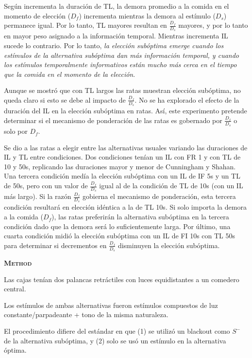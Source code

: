 \documentclass[a4paper,12pt]{article}
\begin{document}
\begin{enumerate}
		Según incrementa la duración de TL, la demora promedio a la comida en el momento de elección ($D_{f}$) incrementa mientras la demora al estímulo ($D_{s}$) permanece igual. Por lo tanto, TL mayores resultan en $\frac{D_{f}}{D_{s}}$ mayores, y por lo tanto en mayor peso asignado a la información temporal. Mientras incrementa IL sucede lo contrario. Por lo tanto, {\itshape la elección subóptima emerge cuando los estímulos de la alternativa subóptima dan más información temporal, y cuando los estímulos temporalmente informativos están mucho más cerca en el tiempo que la comida en el momento de la elección}.
\end{enumerate}

Aunque se mostró que con TL largos las ratas muestran elección subóptima, no queda claro si esto se debe al impacto de $\frac{D_{f}}{D_{s}}$. No se ha explorado el efecto de la duración del IL en la elección subóptima en ratas. Así, este experimento pretende determinar si el mecanismo de ponderación de las ratas es gobernado por $\frac{D_{f}}{D_{s}}$ o solo por $D_{f}$.

Se dio a las ratas a elegir entre las alternativas usuales variando las duraciones de IL y TL entre condiciones. Dos condiciones tenían un IL con FR 1 y con TL de 10 y 50s, replicando las duraciones mayor y menor de Cunningham y Shahan. Una tercera condición medía la elección subóptima con un IL de IF 5s y un TL de 50s, pero con un valor de $\frac{D_{f}}{D_{s}}$ igual al de la condición de TL de 10s (con un IL más largo). Si la razón $\frac{D_{f}}{D_{s}}$ gobierna el mecanismo de ponderación, esta tercera condición resultará en elección idéntica a la de TL 10s. Si solo importa la demora a la comida ($D_{f}$), las ratas preferirán la alternativa subóptima en la tercera condición dado que la demora será lo suficientemente larga. Por último, una cuarta condición midió la elección subóptima con un IL de FI 10s con TL 50s para determinar si decrementos en $\frac{D_{f}}{D_{s}}$ disminuyen la elección subóptima.

{\scshape\bfseries Method}

Las cajas tenían dos palancas retráctiles con luces equidistantes a un comedero central.

Los estímulos de ambas alternativas fueron estímulos compuestos de luz constante/parpadeante + tono de la misma naturaleza.

El procedimiento difiere del estándar en que (1) se utilizó un blackout como $S^{-}$ de la alternativa subóptima, y (2) solo se usó un estímulo en la alternativa óptima.
\end{document}
